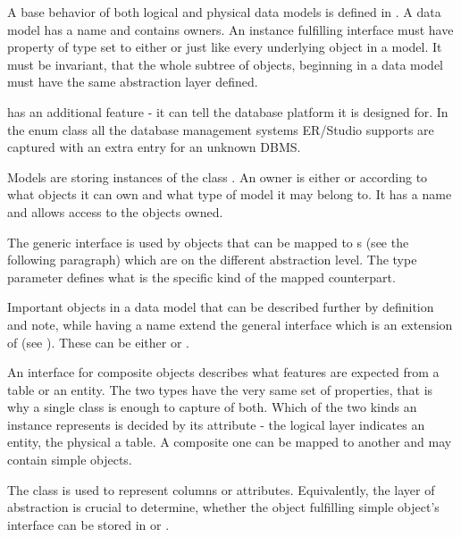 A base behavior of both logical and physical data models is defined in .
A data model has a name and contains owners. An instance fulfilling  interface must have property of type  set to either  or  just like every underlying object in a model.
It must be invariant, that the whole subtree of objects, beginning in a data model must have the same abstraction layer defined.

 has an additional feature - it can tell the database platform it is designed for. 
In the enum class  all the database management systems ER/Studio supports are captured with an extra entry for an unknown DBMS.

Models are storing instances of the class . An owner is either  or  according to what objects it can own and what type of model it may belong to. 
It has a name and allows access to the objects owned.

The generic interface  is used by objects that can be mapped to s (see the following paragraph) which are on the different abstraction level. The type parameter defines what is the specific kind of the mapped counterpart.

Important objects in a data model that can be described further by definition and note, while having a name extend the general  interface which is an extension of  (see ). 
These can be either  or .

An interface for composite objects describes what features are expected from a table or an entity.
The two types have the very same set of properties, that is why a single class is enough to capture of both. 
Which of the two kinds an instance represents is decided by its  attribute - the logical layer indicates an entity, the physical a table.
A composite one can be mapped to another  and may contain simple objects.

The  class is used to represent columns or attributes. Equivalently, the layer of abstraction is crucial to determine, whether the object fulfilling simple object's interface can be stored in  or .

